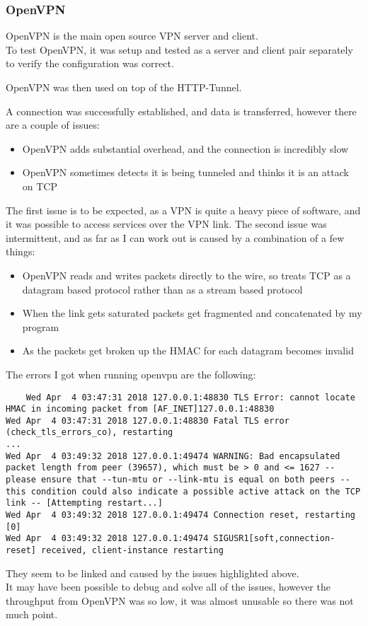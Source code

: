 \subsubsection{OpenVPN}
OpenVPN is the main open source VPN server and client.\\
To test OpenVPN, it was setup and tested as a server and client pair separately to verify the configuration was correct.\par
OpenVPN was then used on top of the HTTP-Tunnel.\par
A connection was successfully established, and data is transferred, however there are a couple of issues:
\begin{itemize}
    \item OpenVPN adds substantial overhead, and the connection is incredibly slow
    \item OpenVPN sometimes detects it is being tunneled and thinks it is an attack on TCP
\end{itemize}
The first issue is to be expected, as a VPN is quite a heavy piece of software, and it was possible to access services over the VPN link.
The second issue was intermittent, and as far as I can work out is caused by a combination of a few things:
\begin{itemize}
    \item OpenVPN reads and writes packets directly to the wire, so treats TCP as a datagram based protocol rather than as a stream based protocol
    \item When the link gets saturated packets get fragmented and concatenated by my program
    \item As the packets get broken up the HMAC for each datagram becomes invalid
\end{itemize}
The errors I got when running openvpn are the following:
\begin{verbatim}
    Wed Apr  4 03:47:31 2018 127.0.0.1:48830 TLS Error: cannot locate HMAC in incoming packet from [AF_INET]127.0.0.1:48830
Wed Apr  4 03:47:31 2018 127.0.0.1:48830 Fatal TLS error (check_tls_errors_co), restarting
...
Wed Apr  4 03:49:32 2018 127.0.0.1:49474 WARNING: Bad encapsulated packet length from peer (39657), which must be > 0 and <= 1627 -- please ensure that --tun-mtu or --link-mtu is equal on both peers -- this condition could also indicate a possible active attack on the TCP link -- [Attempting restart...]
Wed Apr  4 03:49:32 2018 127.0.0.1:49474 Connection reset, restarting [0]
Wed Apr  4 03:49:32 2018 127.0.0.1:49474 SIGUSR1[soft,connection-reset] received, client-instance restarting
\end{verbatim}
They seem to be linked and caused by the issues highlighted above.\\
It may have been possible to debug and solve all of the issues, however the throughput from OpenVPN was so low, it was almost unusable so there was not much point.

